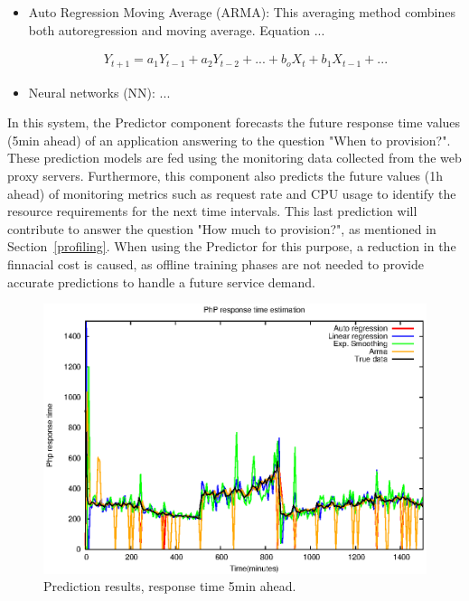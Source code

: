\begin{itemize}
\item Auto Regression Moving Average (ARMA): This averaging method combines both autoregression and moving average. Equation ...

\begin{equation}\label{xx}
\begin{split}
Y_{t+1} =a_1 Y_{t-1} + a_2 Y_{t-2} + ... + b_o X_t + b_1 X_{t-1} + ...
\end{split}
\end{equation}


\item Neural networks (NN): ...
\end{itemize}


In this system, the Predictor component forecasts the future response time values (5min ahead) of an application answering to the question "When to provision?". These prediction models are fed using the monitoring data collected from the web proxy servers. Furthermore, this component also predicts the future values (1h ahead) of monitoring metrics such as request rate and CPU usage to  identify the resource requirements for the next time intervals. This last prediction will contribute to answer the question "How much to provision?", as mentioned in Section~\ref{profiling}.
When using the Predictor for this purpose, a reduction in the finnacial cost is caused, as offline training phases are not needed to provide accurate predictions to handle a future service demand.

\begin{figure}[htb]
  \begin{center}
    \includegraphics[width=.85\linewidth]{images/prediction_models_6min.eps}
  \end{center}
\vspace{-5mm}
  \caption{Prediction results, response time 5min ahead.}
  \label{threshold}
\end{figure}

